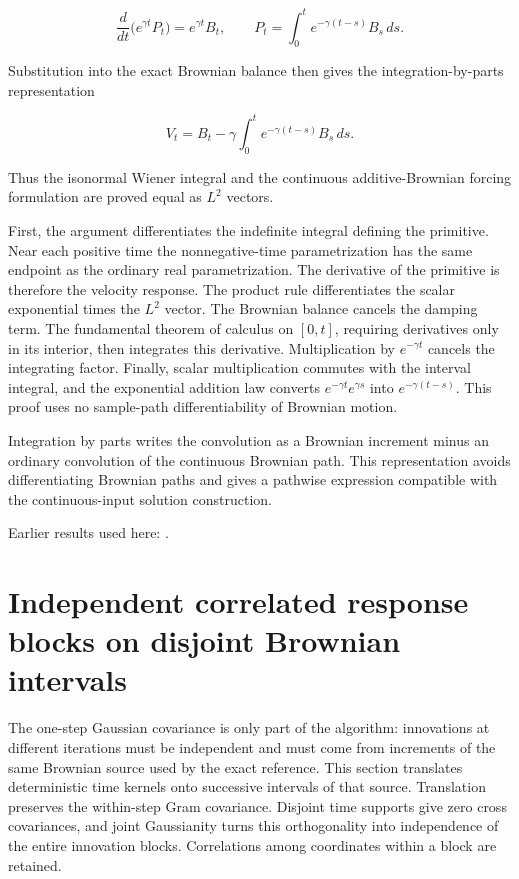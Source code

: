 \documentclass[11pt,a4paper]{report}
\begin{document}
\[\frac{d}{dt}\bigl(e^{\gamma t}P_t\bigr)=e^{\gamma t}B_t,\qquad P_t=\int_0^t e^{-\gamma(t-s)}B_s\,ds.\]

Substitution into the exact Brownian balance then gives the integration-by-parts representation

\[V_t=B_t-\gamma\int_0^t e^{-\gamma(t-s)}B_s\,ds.\]

Thus the isonormal Wiener integral and the continuous additive-Brownian forcing formulation are proved equal as \(L^{2}\) vectors.



First, the argument differentiates the indefinite integral defining the primitive. Near each positive time the nonnegative-time parametrization has the same endpoint as the ordinary real parametrization. The derivative of the primitive is therefore the velocity response. The product rule differentiates the scalar exponential times the \(L^{2}\) vector. The Brownian balance cancels the damping term. The fundamental theorem of calculus on \([0,t]\), requiring derivatives only in its interior, then integrates this derivative. Multiplication by \(e^{-\gamma t}\) cancels the integrating factor. Finally, scalar multiplication commutes with the interval integral, and the exponential addition law converts \(e^{-\gamma t}e^{\gamma s}\) into \(e^{-\gamma(t-s)}\). This proof uses no sample-path differentiability of Brownian motion.



Integration by parts writes the convolution as a Brownian increment minus an ordinary convolution of the continuous Brownian path. This representation avoids differentiating Brownian paths and gives a pathwise expression compatible with the continuous-input solution construction.



Earlier results used here: \cite[Section~3.8.9]{LangevinLean2026ULASC}.
\section{\texorpdfstring{Independent correlated response blocks on disjoint Brownian intervals}{Independent correlated response blocks on disjoint Brownian intervals}}
\label{proof-module-KineticLangevin-BrownianSegments-lean}


The one-step Gaussian covariance is only part of the algorithm: innovations at different iterations must be independent and must come from increments of the same Brownian source used by the exact reference. This section translates deterministic time kernels onto successive intervals of that source. Translation preserves the within-step Gram covariance. Disjoint time supports give zero cross covariances, and joint Gaussianity turns this orthogonality into independence of the entire innovation blocks. Correlations among coordinates within a block are retained.
\end{document}
